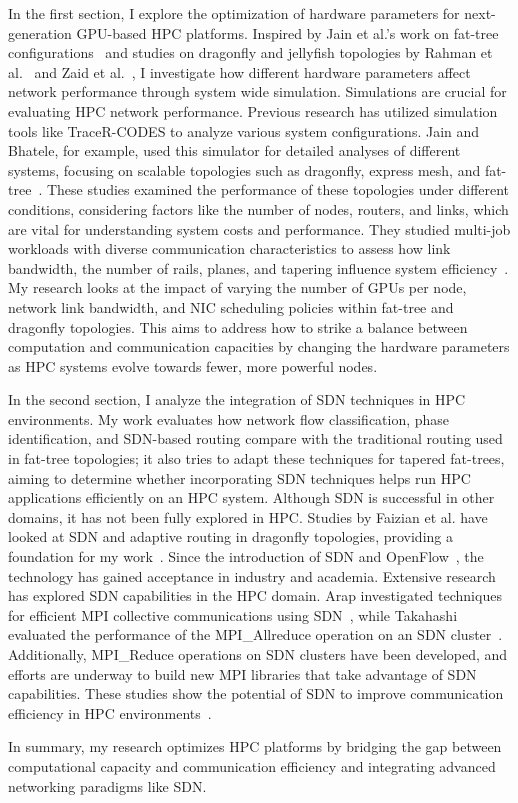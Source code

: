 In the first section, I explore the optimization of hardware parameters 
for next-generation GPU-based HPC platforms. Inspired by Jain et al.'s work on fat-tree configurations~\cite{jain2017predicting} 
and studies on dragonfly and jellyfish topologies by Rahman et al.~\cite{rahman2019topology} and Zaid et al.~\cite{alzaid2021multi}, I investigate how different hardware parameters affect network performance through system wide simulation.
Simulations are crucial for evaluating HPC network performance. 
Previous research has utilized simulation tools like TraceR-CODES to analyze various system configurations. 
Jain and Bhatele, for example, used this simulator for detailed analyses 
of different systems, focusing on scalable topologies such as dragonfly, express mesh, and fat-tree~\cite{bhatele2019analyzing}. 
These studies examined the performance of these topologies under different conditions, 
considering factors like the number of nodes, routers, and links, 
which are vital for understanding system costs and performance.
They studied multi-job workloads with diverse communication characteristics 
to assess how link bandwidth, the number of rails, planes, and tapering 
influence system efficiency~\cite{jain2017predicting}. 
My research looks at the impact of varying the number of GPUs per node, 
network link bandwidth, and NIC scheduling policies within 
fat-tree and dragonfly topologies. 
This aims to address how to strike a balance between computation 
and communication capacities by changing the hardware parameters
as HPC systems evolve towards fewer, more powerful nodes.

In the second section, I analyze the integration of SDN techniques in HPC environments.
My work evaluates how network flow classification, phase identification, and SDN-based routing compare with the traditional routing used in fat-tree topologies; it also tries to adapt these techniques for tapered fat-trees, aiming to determine whether incorporating SDN techniques helps run HPC applications efficiently on an HPC system.
Although SDN is successful in other domains, it has not been fully explored in HPC. 
Studies by Faizian et al. have looked at SDN and adaptive routing in 
dragonfly topologies, providing a foundation for my work~\cite{faizian2017comparative}.
Since the introduction of SDN and OpenFlow~\cite{openflow}, the technology has gained acceptance in 
industry and academia. Extensive research has explored SDN capabilities in the HPC domain. 
Arap investigated techniques for efficient MPI collective communications using SDN~\cite{arap2014software}, 
while Takahashi evaluated the performance of the MPI\_Allreduce operation on an SDN cluster~\cite{takahashi2014performance}. 
Additionally, MPI\_Reduce operations on SDN clusters have been developed, 
and efforts are underway to build new MPI libraries that 
take advantage of SDN capabilities. These studies show the potential of SDN to 
improve communication efficiency in HPC environments~\cite{munkhdorj2015design, takahashi2015concept}.

In summary, my research optimizes HPC platforms by bridging the gap between 
computational capacity and communication efficiency and integrating advanced networking paradigms like SDN. 
